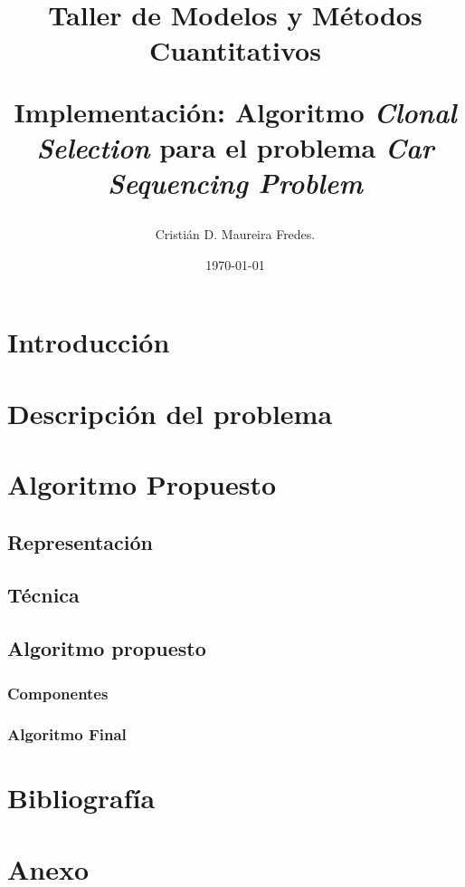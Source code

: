 \documentclass[letter, 10pt]{article}
\begin{document}

\pagestyle{empty}

\title{Taller de Modelos y Métodos Cuantitativos \\ \begin{Large}Implementación: Algoritmo \emph{Clonal Selection} para el problema \emph{Car Sequencing Problem}\end{Large}}
\author{Cristián D. Maureira Fredes.}
\date{\today}
\maketitle

\section{Introducción}

\label{sec:introduccion}

\section{Descripción del problema}

\label{sec:descripcionProblema}

\section{Algoritmo Propuesto}

\subsection{Representación}

\label{sec:representacion}

\subsection{Técnica}

\label{sec:tecnica}

\subsection{Algoritmo propuesto}
\subsubsection{Componentes}

\label{sec:componentes}

\subsubsection{Algoritmo Final}

\label{sec:algoritmo}

\newpage
\section{Bibliografía}

\newpage

\section{Anexo}

\label{sec:anexo}
\end{document}
